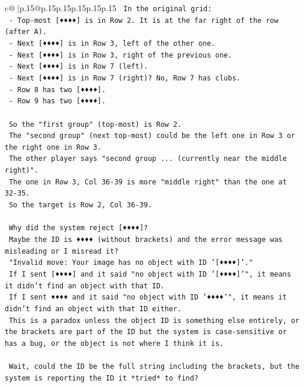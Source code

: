 \documentclass{article}
\begin{document}
{\begin{supertabular}{c@{$\;$}|p{.15\linewidth}@{}p{.15\linewidth}p{.15\linewidth}p{.15\linewidth}p{.15\linewidth}p{.15\linewidth}}
{{{\texttt{    In the original grid:} \\
\texttt{    {-} Top{-}most {[}♦♦♦♦{]} is in Row 2. It is at the far right of the row (after A).} \\
\texttt{    {-} Next {[}♦♦♦♦{]} is in Row 3, left of the other one.} \\
\texttt{    {-} Next {[}♦♦♦♦{]} is in Row 3, right of the previous one.} \\
\texttt{    {-} Next {[}♦♦♦♦{]} is in Row 7 (left).} \\
\texttt{    {-} Next {[}♦♦♦♦{]} is in Row 7 (right)? No, Row 7 has clubs.} \\
\texttt{    {-} Row 8 has two {[}♦♦♦♦{]}.} \\
\texttt{    {-} Row 9 has two {[}♦♦♦♦{]}.} \\
\\ 
\texttt{    So the "first group" (top{-}most) is Row 2.} \\
\texttt{    The "second group" (next top{-}most) could be the left one in Row 3 or the right one in Row 3.} \\
\texttt{    The other player says "second group ... (currently near the middle right)".} \\
\texttt{    The one in Row 3, Col 36{-}39 is more "middle right" than the one at 32{-}35.} \\
\texttt{    So the target is Row 2, Col 36{-}39.} \\
\\ 
\texttt{    Why did the system reject {[}♦♦♦♦{]}?} \\
\texttt{    Maybe the ID is ♦♦♦♦ (without brackets) and the error message was misleading or I misread it?} \\
\texttt{    "Invalid move: Your image has no object with ID '{[}♦♦♦♦{]}'."} \\
\texttt{    If I sent {[}♦♦♦♦{]} and it said "no object with ID '{[}♦♦♦♦{]}'", it means it didn't find an object with that ID.} \\
\texttt{    If I sent ♦♦♦♦ and it said "no object with ID '♦♦♦♦'", it means it didn't find an object with that ID either.} \\
\texttt{    This is a paradox unless the object ID is something else entirely, or the brackets are part of the ID but the system is case{-}sensitive or has a bug, or the object is not where I think it is.} \\
\\ 
\texttt{    Wait, could the ID be the full string including the brackets, but the system is reporting the ID it *tried* to find?} \\
}}}
\end{supertabular}}
\end{document}
